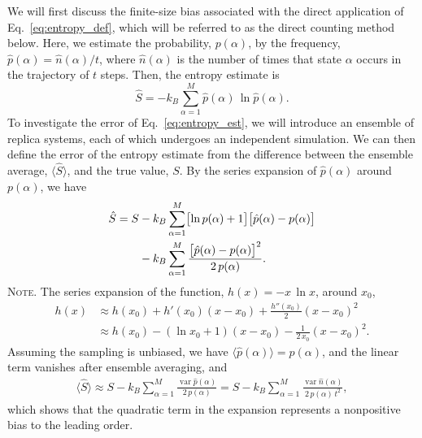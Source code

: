 \documentclass[reprint, superscriptaddress]{revtex4-1}
\newcommand{\note}[1]{{\color{DarkGreen}\footnotesize \textsc{Note.} #1}}
\begin{document}
We will first discuss the finite-size bias associated with
the direct application of Eq.~\eqref{eq:entropy_def},
which will be referred to as the direct counting method below.
%
Here, we estimate the probability, $p(\alpha)$,
by the frequency, $\hat{p}(\alpha) = \hat{n}(\alpha) / t$,
where $\hat{n}(\alpha)$ is the number of times that state $\alpha$ occurs in the trajectory of $t$ steps.
%
Then, the entropy estimate is
%
\begin{equation}
  \hat S
  =
  -k_B \sum_{\alpha = 1}^M \hat{p}(\alpha) \, \ln \hat{p}(\alpha)
  .
  \label{eq:entropy_est}
\end{equation}
%
To investigate the error of Eq.~\eqref{eq:entropy_est},
we will introduce an ensemble of replica systems,
each of which undergoes an independent simulation.
%
We can then define the error of the entropy estimate
from the difference
between the ensemble average,
$\bigl\langle \hat S \bigr\rangle$,
and the true value, $S$.
%
By the series expansion of $\hat{p}(\alpha)$ around $p(\alpha)$, we have
%
\begin{align}
  \hat S
  =
  S
  &- k_B \sum_{\alpha = 1}^M
    \bigl[\ln p(\alpha) + 1 \bigr]
    \bigl[ \hat{p}(\alpha) - p(\alpha) \bigr]
  \notag\\
  &- k_B \sum_{\alpha = 1}^M
    \frac{ \bigl[ \hat{p}(\alpha) - p(\alpha) \bigr]^2 } { 2 \, p(\alpha) }
  .
  \notag
\end{align}
%
\note{The series expansion of the function, $h(x) = -x \, \ln x$,
around $x_0$,
%
\begin{align*}
  h(x)
  &\approx h(x_0) + h'(x_0) (x - x_0) + \frac{h''(x_0)}{2} (x - x_0)^2 \\
  &\approx h(x_0) - (\ln x_0 + 1) ( x - x_0) - \frac{1}{2 \, x_0} (x - x_0)^2
  .
\end{align*}
}
%
Assuming the sampling is unbiased,
we have $\langle \hat{p}(\alpha) \rangle = p(\alpha)$,
and the linear term vanishes
after ensemble averaging, and
%
\begin{align}
  \bigl\langle \hat S \bigr\rangle
  \approx
  S - k_B \sum_{\alpha = 1}^M
    \frac{ \operatorname{var} \hat{p}(\alpha) } { 2 \, p(\alpha) }
  =
  S - k_B \sum_{\alpha = 1}^M
    \frac{ \operatorname{var} \hat{n}(\alpha) } { 2 \, p(\alpha) \, t^2 }
  ,
  \label{eq:entest_2nd}
\end{align}
%
which shows that the quadratic term in the expansion
represents a nonpositive bias to the leading order.
\end{document}
